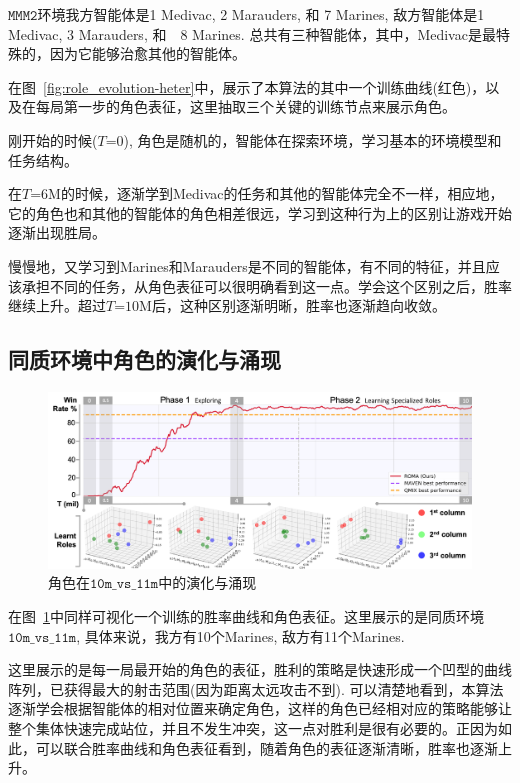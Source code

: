 $\mathtt{MMM2}$环境我方智能体是1 Medivac, 2 Marauders, 和 7 Marines, 敌方智能体是1 Medivac, 3 Marauders, 和　8 Marines. 总共有三种智能体，其中，Medivac是最特殊的，因为它能够治愈其他的智能体。

在图~\ref{fig:role_evolution-heter}中，展示了本算法的其中一个训练曲线(红色)，以及在每局第一步的角色表征，这里抽取三个关键的训练节点来展示角色。

刚开始的时候($T$=$0$), 角色是随机的，智能体在探索环境，学习基本的环境模型和任务结构。

在$T$=$6$M的时候，逐渐学到Medivac的任务和其他的智能体完全不一样，相应地，它的角色也和其他的智能体的角色相差很远，学习到这种行为上的区别让游戏开始逐渐出现胜局。

慢慢地，又学习到Marines和Marauders是不同的智能体，有不同的特征，并且应该承担不同的任务，从角色表征可以很明确看到这一点。学会这个区别之后，胜率继续上升。超过$T$=$10$M后，这种区别逐渐明晰，胜率也逐渐趋向收敛。

\subsection{同质环境中角色的演化与涌现}
\begin{figure}
  \includegraphics[width=\linewidth]{figures/evolution/evolution_10m_vs_11m.png}
  \caption{角色在$\mathtt{10m\_vs\_11m}$中的演化与涌现}\label{fig:role_evolution-homo}
\end{figure}

在图~\ref{fig:role_evolution-homo}中同样可视化一个训练的胜率曲线和角色表征。这里展示的是同质环境$\mathtt{10m\_vs\_11m}$, 具体来说，我方有10个Marines, 敌方有11个Marines.

这里展示的是每一局最开始的角色的表征，胜利的策略是快速形成一个凹型的曲线阵列，已获得最大的射击范围(因为距离太远攻击不到). 可以清楚地看到，本算法逐渐学会根据智能体的相对位置来确定角色，这样的角色已经相对应的策略能够让整个集体快速完成站位，并且不发生冲突，这一点对胜利是很有必要的。正因为如此，可以联合胜率曲线和角色表征看到，随着角色的表征逐渐清晰，胜率也逐渐上升。

